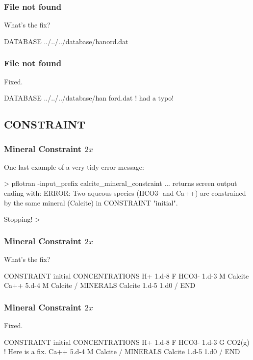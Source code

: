 \documentclass{beamer}
\newcommand\gehcomment[1]{{{\color{orange} #1}}}
\newcommand\redcomment[1]{{{\color{red} #1}}}
\newcommand\bluecomment[1]{{{\color{blue} #1}}}
\newcommand\magentacomment[1]{{{\color{magenta} #1}}}
\begin{document}
\begin{frame}\frametitle{File not found}
\redcomment{What's the fix?}
\begin{semiverbatim}
DATABASE ../../../database/hanord.dat
\end{semiverbatim}

\end{frame}

\begin{frame}\frametitle{File not found}
\redcomment{Fixed.}
\begin{semiverbatim}
DATABASE ../../../database/han\magentacomment{f}ord.dat \bluecomment{! had a typo!}
\end{semiverbatim}

\end{frame}

\subsection{CONSTRAINT}

\begin{frame}\frametitle{Mineral Constraint ${2x}$}
One last example of a very tidy error message:
\begin{semiverbatim}

> pflotran -input_prefix calcite_mineral_constraint
... \gehcomment{returns screen output ending with:}
  ERROR: Two aqueous species (HCO3- and Ca++) are
  constrained by the same mineral (Calcite) in 
  CONSTRAINT "initial".

  Stopping!
>
\end{semiverbatim}

\end{frame}

\begin{frame}\frametitle{Mineral Constraint ${2x}$}
\redcomment{What's the fix?}
\begin{semiverbatim}

CONSTRAINT initial
  CONCENTRATIONS
    H+     1.d-8      F
    HCO3-  1.d-3      M  Calcite
    Ca++   5.d-4      M  Calcite
  /
  MINERALS
    Calcite 1.d-5 1.d0
  /
END
\end{semiverbatim}

\end{frame}

\begin{frame}\frametitle{Mineral Constraint ${2x}$}

\redcomment{Fixed.}
\begin{semiverbatim}

CONSTRAINT initial
  CONCENTRATIONS
    H+     1.d-8      F
    HCO3-  1.d-3      \magentacomment{G  CO2(g)} \bluecomment{! Here is a fix.}
    Ca++   5.d-4      M  Calcite
  /
  MINERALS
    Calcite 1.d-5 1.d0
  /
END
\end{semiverbatim}

\end{frame}
\end{document}
